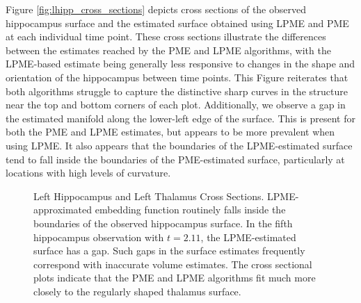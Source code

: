 \documentclass[12pt]{article}
\theoremstyle{definition}
\begin{document}
Figure \ref{fig:lhipp_cross_sections} depicts cross sections of the observed hippocampus surface and the estimated surface obtained using LPME and PME at each individual time point. These cross sections illustrate the differences between the estimates reached by the PME and LPME algorithms, with the LPME-based estimate being generally less responsive to changes in the shape and orientation of the hippocampus between time points. This Figure reiterates that both algorithms struggle to capture the distinctive sharp curves in the structure near the top and bottom corners of each plot. Additionally, we observe a gap in the estimated manifold along the lower-left edge of the surface. This is present for both the PME and LPME estimates, but appears to be more prevalent when using LPME. It also appears that the boundaries of the LPME-estimated surface tend to fall inside the boundaries of the PME-estimated surface, particularly at locations with high levels of curvature.

\begin{figure}
  \centering
  \hfill

  \caption{{\footnotesize Left Hippocampus and Left Thalamus Cross Sections. LPME-approximated embedding function routinely falls inside the boundaries of the observed hippocampus surface. In the fifth hippocampus observation with $t=2.11$, the LPME-estimated surface has a gap. Such gaps in the surface estimates frequently correspond with inaccurate volume estimates. The cross sectional plots indicate that the PME and LPME algorithms fit much more closely to the regularly shaped thalamus surface.}}
  \label{fig:adni_cross_sections}
\end{figure}
\end{document}
